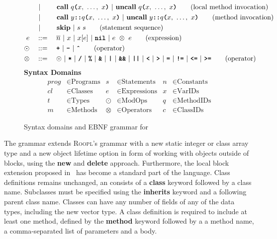 \begin{figure}[h]
\begin{align}
    			&\ |\ \qquad \textbf{call}\ q\textbf{\texttt{(}}x,\ \dots,\ x\textbf{\texttt{)}}\ |\ \textbf{uncall}\ q\textbf{\texttt{(}}x,\ \dots,\ x\textbf{\texttt{)}}\tag{local method invocation}\\
    			&\ |\ \qquad \textbf{call}\ y\textbf{\texttt{::}}q\textbf{\texttt{(}}x,\ \dots,\ x\textbf{\texttt{)}}\ |\ \textbf{uncall}\ y\textbf{\texttt{::}}q\textbf{\texttt{(}}x,\ \dots,\ x\textbf{\texttt{)}}\tag{method invocation}\\
    			&\ |\ \qquad \textbf{skip}\ |\ s\ s\tag{statement sequence}\\
    e			\quad&::=\quad \overline{n}\ |\ x\ |\ x[e]\ |\ \textbf{\texttt{nil}}\ |\ e\ \otimes\ e\tag{expression}\\
    \odot	\quad&::=\quad \textbf{\texttt{+}}\ |\ \textbf{\texttt{-}}\ |\ \textbf{\texttt{\^}}\tag{operator}\\
    \otimes\quad&::=\quad \odot\ |\ \textbf{\texttt{*}}\ |\ \textbf{\texttt{/}}\ |\ \textbf{\texttt{\%}}\ |\ \textbf{\texttt{\&}}\ |\ \textbf{\texttt{|}}\ |\ \textbf{\texttt{\&\&}}\ |\ \textbf{\texttt{||}}\ |\ \textbf{\texttt{<}}\ |\ \textbf{\texttt{\textgreater}}\ |\ \textbf{\texttt{=}}\ |\ \textbf{\texttt{!=}}\ |\ \textbf{\texttt{<=}}\ |\ \textbf{\texttt{\textgreater=}}\tag{operator}
    \end{align}
    \vspace{2mm}
    \textbf{Syntax Domains}
    \begin{align*}
    prog &\in \text{Programs} & s &\in \text{Statements}      & n &\in \text{Constants} \\
    cl   &\in \text{Classes}  & e &\in \text{Expressions}     & x &\in \text{VarIDs}    \\
    t    &\in \text{Types}    & \odot &\in \text{ModOps}      & q &\in \text{MethodIDs} \\
    m    &\in \text{Methods}  & \otimes &\in \text{Operators} & c &\in \text{ClassIDs}
    \end{align*}
    \caption{Syntax domains and EBNF grammar for \rooplpp}
    \label{fig:roopl-grammar}
\end{figure}

The \rooplpp grammar extends \textsc{Roopl}'s grammar with a new static integer or class array type and a new object lifetime option in form of working with objects outside of blocks, using the \textbf{new} and \textbf{delete} approach. Furthermore, the local block extension proposed in~\cite{th:roopl} has become a standard part of the language. Class definitions remains unchanged, an consists of a \textbf{class} keyword followed by a class name. Subclasses must be specified using the \textbf{inherits} keyword and a following parent class name. Classes can have any number of fields of any of the data types, including the new vector type. A class definition is required to include at least one method, defined by the \textbf{method} keyword followed by a a method name, a comma-separated list of parameters and a body.


